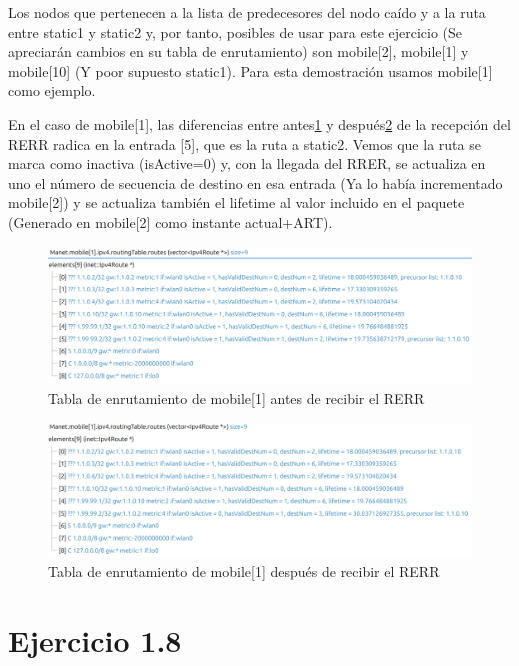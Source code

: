 Los nodos que pertenecen a la lista de predecesores del nodo caído y a la ruta entre static1 y static2 y, por tanto, posibles de usar para este ejercicio (Se apreciarán cambios en su tabla de enrutamiento) son mobile[2], mobile[1] y mobile[10] (Y poor supuesto static1). Para esta demostración usamos mobile[1] como ejemplo.

En el caso de mobile[1], las diferencias entre antes\ref{fig:RerrRouteTablePre} y después\ref{fig:RerrRouteTablePos} de la recepción del RERR radica en la entrada [5], que es la ruta a static2. Vemos que la ruta se marca como inactiva (isActive=0) y, con la llegada del RRER, se actualiza en uno el número de secuencia de destino en esa entrada (Ya lo había incrementado mobile[2]) y se actualiza también el lifetime al valor incluido en el paquete (Generado en mobile[2] como instante actual+ART).

\begin{figure}[H]
    \centering
    \includegraphics[width=125mm, scale=0.75]{imaxes/aodv/ejercicio7_1.png}
    \caption{Tabla de enrutamiento de mobile[1] antes de recibir el RERR}
    \label{fig:RerrRouteTablePre}
\end{figure}

\begin{figure}[H]
    \centering
    \includegraphics[width=125mm, scale=0.75]{imaxes/aodv/ejercicio7_2.png}
    \caption{Tabla de enrutamiento de mobile[1] después de recibir el RERR}
    \label{fig:RerrRouteTablePos}
\end{figure}

\vspace{1.25cm}
\newpage
\section{Ejercicio 1.8}

